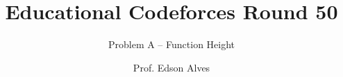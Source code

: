\title{Educational Codeforces Round 50}
\subtitle{Problem A -- Function Height}
\date{}
\author{Prof. Edson Alves}
